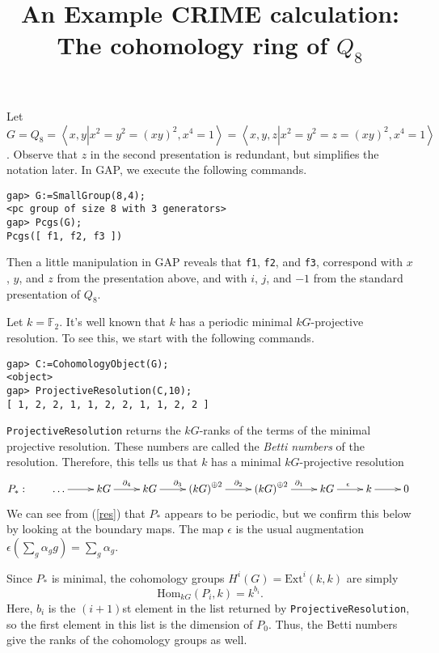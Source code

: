 \documentclass[12pt]{article}
\title{An Example \textsf{CRIME} calculation: 
The cohomology ring of $Q_8$}\author{}
\begin{document}
\maketitle

Let $G=Q_8=\left\langle x,y\left|
x^2=y^2=\left(xy\right)^2,x^4=1\right.\right\rangle
=\left\langle x,y,z\left|
x^2=y^2=z=\left(xy\right)^2,x^4=1\right.\right\rangle$.
Observe that $z$ in the second presentation is redundant,
but simplifies the notation later. In \textsf{GAP}, we execute
the following commands.
\begin{verbatim}
gap> G:=SmallGroup(8,4);
<pc group of size 8 with 3 generators>
gap> Pcgs(G);
Pcgs([ f1, f2, f3 ])
\end{verbatim}
Then a little manipulation in \textsf{ GAP}
reveals that \verb!f1!, \verb!f2!, and \verb!f3!,
correspond with $x$, $y$, and $z$
from the presentation above, and with $i$,
$j$, and $-1$ from the standard presentation 
of $Q_8$.

Let $k=\mathbb{F}_2$. It's well known that $k$
has a periodic minimal $kG$-projective resolution.
To see this, we start with the following commands.

\begin{verbatim}
gap> C:=CohomologyObject(G);
<object>
gap> ProjectiveResolution(C,10);
[ 1, 2, 2, 1, 1, 2, 2, 1, 1, 2, 2 ]
\end{verbatim}

\verb!ProjectiveResolution! returns the $kG$-ranks
of the terms of the minimal projective resolution.
These numbers are called the {\em Betti numbers}
of the resolution.
Therefore, this tells us that $k$ has a minimal 
$kG$-projective resolution 
\begin{equation}\label{res}
P_\ast:\qquad\begin{xy}\xymatrix{
\dots\ar[r]&kG\ar[r]^{\partial_4}
&kG\ar[r]^{\partial_3}
&\left(kG\right)^{\oplus 2}\ar[r]^{\partial_2}
&\left(kG\right)^{\oplus 2}\ar[r]^{\partial_1}
&kG\ar[r]^{\epsilon}
&k\ar[r]&0
}\end{xy}\end{equation}
We can see from (\ref{res}) that $P_\ast$ 
appears to be periodic, but we
confirm this below by looking at the boundary maps.
The map $\epsilon$ is the usual augmentation
$\epsilon\left(\sum_g\alpha_gg\right)
=\sum_g\alpha_g$.

Since $P_\ast$ is minimal, 
the cohomology groups $H^i\left(G\right)
=\mathrm{Ext}^i\left(k,k\right)$ are simply
\[\mathrm{Hom}_{kG}\left(P_i,k\right)=k^{b_i}.\]
Here, $b_i$ is the $\left(i+1\right)$st element
in the list returned by \verb!ProjectiveResolution!,
so the first element in this list is the dimension
of $P_0$. Thus, the Betti numbers give the 
ranks of the cohomology groups as well.
\end{document}
